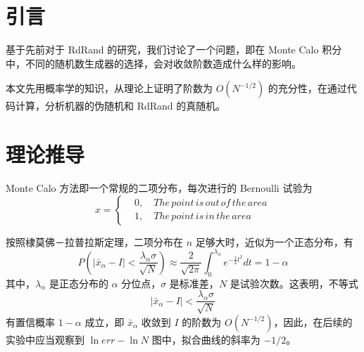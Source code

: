 \documentclass[12pt,a4paper]{article}%
\begin{document}
    \newpage%


    \section{引言}
    基于先前对于 RdRand 的研究，我们讨论了一个问题，即在 Monte Calo 积分中，不同的随机数生成器的选择，会对收敛阶数造成什么样的影响。

    本文先用概率学的知识，从理论上证明了阶数为 \(O(N^{-1/2})\) 的充分性，在通过代码计算，分析机器的伪随机和 RdRand 的真随机。

    \section{理论推导}
    Monte Calo 方法即一个常规的二项分布，每次进行的 Bernoulli 试验为
    \begin{equation*}
        x =\left\{
        \begin{aligned}
            & 0, \quad The\, point\, is\, out\, of\, the\, area\\
            & 1, \quad The\, point\, is\, in\, the\, area
        \end{aligned}
        \right.
    \end{equation*}

    按照棣莫佛－拉普拉斯定理，二项分布在 \(n\) 足够大时，近似为一个正态分布，有
    \begin{equation*}
        P(\left| \bar{x}_\alpha - I \right| < \frac{\lambda_\alpha \sigma}{\sqrt {N}}) \approx \frac{2}{\sqrt{2 \pi}} \int^{\lambda_\alpha}_0 e^{-\frac{1}{2} t^2} dt = 1 - \alpha
    \end{equation*}
    其中，\(\lambda_\alpha\) 是正态分布的 \(\alpha\) 分位点，\(\sigma\) 是标准差，\(N\) 是试验次数。这表明，不等式
    \begin{equation*}
        \left| \bar{x}_\alpha - I \right| < \frac{\lambda_\alpha \sigma}{\sqrt {N}}
    \end{equation*}
    有置信概率 \(1 - \alpha\) 成立，即 \(\bar{x}_\alpha\) 收敛到 \(I\) 的阶数为 \(O (N^{-1 / 2})\)，因此，在后续的实验中应当观察到 \(\ln err - \ln N\) 图中，拟合曲线的斜率为 \(- 1 / 2\)。
\end{document}
